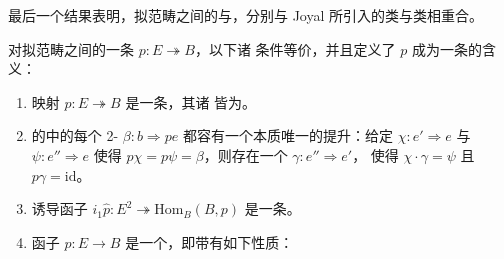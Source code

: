 最后一个结果表明，拟范畴之间的\trDiscreteCocartesianFibration{}与\trDiscreteCartesianFibration，分别与
Joyal \cite{bib61} 所引入的\trLeftFibration{}类与\trRightFibration{}类相重合。

\begin{proposition}\label{prop:discrete-cartesian-analytic}
对拟范畴之间的一条\trIsofibration{} $p\colon E\twoheadrightarrow B$，以下诸
条件等价，并且定义了 $p$ 成为一条\textbf{\trDiscreteCartesianFibration}的含义：
\begin{enumerate}[label=(\roman*)]
\item 映射 $p\colon E\twoheadrightarrow B$ 是一条\trCartesianFibration，其诸%
\trFiber{}皆为\trKanComplex。
\item \trQuasiCategory{}的\trHomotopyTwoCategory{}中的每个 2-\trCell{}
$\beta\colon b\Rightarrow pe$ 都容有一个本质唯一的提升：给定
$\chi\colon e'\Rightarrow e$ 与 $\psi\colon e''\Rightarrow e$ 使得
$p\chi=p\psi=\beta$，则存在一个\trIsomorphism{} $\gamma\colon e''\Rightarrow e'$，
使得 $\chi\cdot\gamma=\psi$ 且 $p\gamma=\mathrm{id}$。
\item 诱导函子 $i_{1}\hat{p}\colon E^{2}\twoheadrightarrow\mathrm{Hom}_{B}(B,p)$
是一条\trTrivialFibration。
\item 函子 $p\colon E\to B$ 是一个\trRightFibration，即带有如下\trLifting{}性质：
\begin{center}
\end{center}
\end{enumerate}
\end{proposition}

